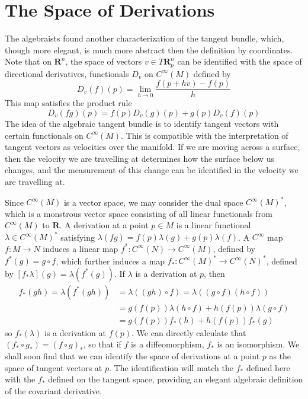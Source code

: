 %
%

\section{The Space of Derivations}

The algebraists found another characterization of the tangent bundle, which, though more elegant, is much more abstract then the definition by coordinates. Note that on $\mathbf{R}^n$, the space of vectors $v \in T\mathbf{R}^n_p$ can be identified with the space of directional derivatives, functionals $D_v$ on $C^\infty(M)$ defined by
%
\[ D_v(f)(p) = \lim_{h \to 0} \frac{f(p + hv) - f(p)}{h} \]
%
This map satisfies the product rule
%
\[ D_v(fg)(p) = f(p) D_v(g)(p) + g(p) D_v(f)(p) \]
%
The idea of the algebraic tangent bundle is to identify tangent vectors with certain functionals on $C^\infty(M)$. This is compatible with the interpretation of tangent vectors as velocities over the manifold. If we are moving across a surface, then the velocity we are travelling at determines how the surface below us changes, and the measurement of this change can be identified in the velocity we are travelling at.

Since $C^\infty(M)$ is a vector space, we may consider the dual space $C^\infty(M)^*$, which is a monstrous vector space consisting of all linear functionals from $C^\infty(M)$ to $\mathbf{R}$. A derivation at a point $p \in M$ is a linear functional $\lambda \in C^\infty(M)^*$ satisfying $\lambda(fg) = f(p) \lambda(g) + g(p) \lambda(f)$. A $C^\infty$ map $f: M \to N$ induces a linear map $f^*: C^\infty(N) \to C^\infty(M)$, defined by $f^*(g) = g \circ f$, which further induces a map $f_*: C^\infty(M)^* \to C^\infty(N)^*$, defined by $[f_*\lambda](g) = \lambda(f^*(g))$. If $\lambda$ is a derivation at $p$, then
%
\begin{align*}
    f_*(gh) = \lambda(f^*(gh)) &= \lambda((gh) \circ f) = \lambda((g \circ f)(h \circ f))\\
    &= g(f(p)) \lambda(h \circ f) + h(f(p)) \lambda(g \circ f)\\
    &= g(f(p)) f_*(h) + h(f(p)) f_*(g)
\end{align*}
%
so $f_*(\lambda)$ is a derivation at $f(p)$. We can directly calculate that $(f_* \circ g_*) = (f \circ g)_*$, so that if $f$ is a diffeomorphism, $f_*$ is an isomorphism. We shall soon find that we can identify the space of derivations at a point $p$ as the space of tangent vectors at $p$. The identification will match the $f_*$ defined here with the $f_*$ defined on the tangent space, providing an elegant algebraic definition of the covariant derivative.

